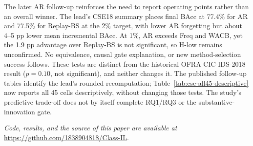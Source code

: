 \documentclass[conference]{IEEEtran}
\begin{document}
The later AR follow-up reinforces the need to report operating points rather
than an overall winner. The lead's CSE18 summary places final BAcc at 77.4\%
for AR and 77.5\% for Replay-BS at the 2\% target, with lower AR forgetting but
about 4--5 pp lower mean incremental BAcc. At 1\%, AR exceeds Freq and WACB,
yet the 1.9 pp advantage over Replay-BS is not significant, so H-low remains
unconfirmed. No equivalence, causal gate explanation, or new method-selection
success follows. These tests are distinct from the historical OFRA
CIC-IDS-2018 result ($p=0.10$, not significant), and neither changes it.
The published follow-up tables identify the lead's rounded recomputation;
Table~\ref{tab:cse-all45-descriptive} now reports all 45 cells descriptively, without changing those tests. The study's predictive trade-off does not by
itself complete RQ1/RQ3 or the substantive-innovation gate.

\par\vspace{5pt}\noindent\textit{Code, results, and the source of this paper are
available at} \url{https://github.com/1838904818/Class-IL}.



\end{document}
